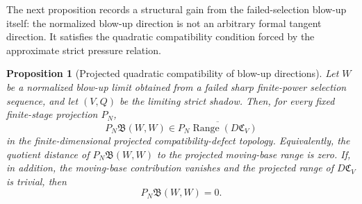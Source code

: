 \documentclass[11pt]{article}
\numberwithin{equation}{section}
\theoremstyle{plain}
\newtheorem{proposition}{Proposition}[section]
\theoremstyle{definition}
\theoremstyle{remark}
\begin{document}
The next proposition records a structural gain from the failed-selection blow-up itself: the normalized blow-up direction is not an arbitrary formal tangent direction.  It satisfies the quadratic compatibility condition forced by the approximate strict pressure relation.

\begin{proposition}[Projected quadratic compatibility of blow-up directions]\label{pII:prop:quadratic-compatibility-blowup}
Let $W$ be a normalized blow-up limit obtained from a failed sharp finite-power selection sequence, and let $(V,Q)$ be the limiting strict shadow.  Then, for every fixed finite-stage projection \(P_N\),
\begin{equation}\label{pII:eq:quadratic-compatible-range}
        P_N\mathfrak B(W,W)
        \in \overline{P_N\operatorname{Range}(D\mathfrak C_V)}
\end{equation}
in the finite-dimensional projected compatibility-defect topology.  Equivalently, the quotient distance of \(P_N\mathfrak B(W,W)\) to the projected moving-base range is zero.  If, in addition, the moving-base contribution vanishes and the projected range of \(D\mathfrak C_V\) is trivial, then
\begin{equation}\label{pII:eq:quadratic-compatible-zero}
        P_N\mathfrak B(W,W)=0.
\end{equation}
\end{proposition}
\end{document}
